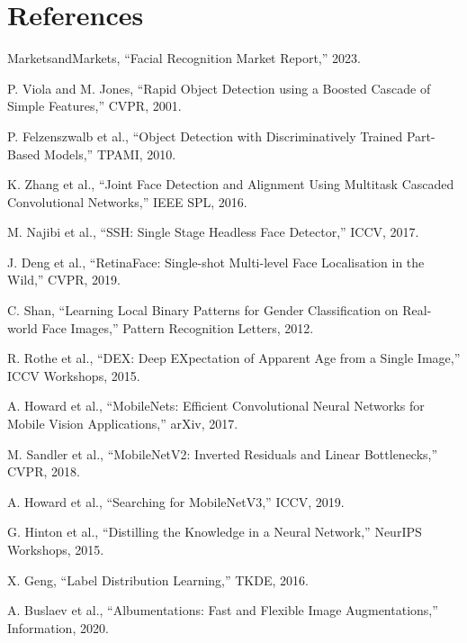 \documentclass[12pt,a4paper]{article}
\begin{document}
\section*{References}

\begin{enumerate}[label={[\arabic*]}]
    \item MarketsandMarkets, ``Facial Recognition Market Report,'' 2023.
    \item P. Viola and M. Jones, ``Rapid Object Detection using a Boosted Cascade of Simple Features,'' CVPR, 2001.
    \item P. Felzenszwalb et al., ``Object Detection with Discriminatively Trained Part-Based Models,'' TPAMI, 2010.
    \item K. Zhang et al., ``Joint Face Detection and Alignment Using Multitask Cascaded Convolutional Networks,'' IEEE SPL, 2016.
    \item M. Najibi et al., ``SSH: Single Stage Headless Face Detector,'' ICCV, 2017.
    \item J. Deng et al., ``RetinaFace: Single-shot Multi-level Face Localisation in the Wild,'' CVPR, 2019.
    \item C. Shan, ``Learning Local Binary Patterns for Gender Classification on Real-world Face Images,'' Pattern Recognition Letters, 2012.
    \item R. Rothe et al., ``DEX: Deep EXpectation of Apparent Age from a Single Image,'' ICCV Workshops, 2015.
    \item A. Howard et al., ``MobileNets: Efficient Convolutional Neural Networks for Mobile Vision Applications,'' arXiv, 2017.
    \item M. Sandler et al., ``MobileNetV2: Inverted Residuals and Linear Bottlenecks,'' CVPR, 2018.
    \item A. Howard et al., ``Searching for MobileNetV3,'' ICCV, 2019.
    \item G. Hinton et al., ``Distilling the Knowledge in a Neural Network,'' NeurIPS Workshops, 2015.
    \item X. Geng, ``Label Distribution Learning,'' TKDE, 2016.
    \item A. Buslaev et al., ``Albumentations: Fast and Flexible Image Augmentations,'' Information, 2020.
\end{enumerate}
\end{document}
